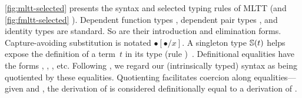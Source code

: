 
\cref{fig:mltt-selected} presents the syntax and selected typing rules of MLTT %
(and \cref{fig:fmltt-selected} \TT).
Dependent function types ,
dependent pair types , and
identity types  are standard.
So are their introduction and elimination forms.
Capture-avoiding substitution is notated $\bullet[\bullet/x]$.
A singleton type $\mathbb{S}({t})$ helps expose the definition of a term~$t$
in its type (rule )~\cite{aspinall1995singleton,stone2000}.
Definitional equalities have the forms %
,
,
,
etc.
Following \citet{altkap2016}, we regard our (intrinsically typed) syntax
as being quotiented by these equalities.
Quotienting facilitates coercion along equalities---given
 and
,
the derivation of  is considered definitionally equal to
a derivation of .

